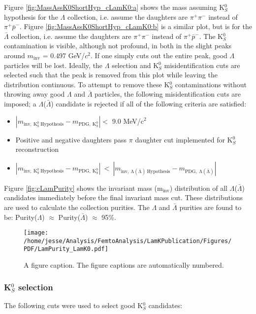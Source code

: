 \documentclass[ALICE,manyauthors]{cernphprep}
\begin{document}
Figure \ref{fig:MassAssK0ShortHyp_cLamK0:a} shows the mass assuming K$^{0}_{S}$ hypothesis for the $\Lambda$ collection, i.e. assume the daughters are $\pi^{+}\pi^{-}$ instead of $\pi^{+}\bar{p}^{-}$.
Figure \ref{fig:MassAssK0ShortHyp_cLamK0:b} is a similar plot, but is for the $\bar{\Lambda}$ collection, i.e. assume the daughters are $\pi^{+}\pi^{-}$ instead of $\pi^{+}\bar{p}^{-}$.
The K$^{0}_{S}$ contamination is visible, although not profound, in both in the slight peaks around $m_{\mathrm{inv}}$ = 0.497 GeV/$c^{2}$.
If one simply cuts out the entire peak, good $\Lambda$ particles will be lost.
Ideally, the $\Lambda$ selection and K$^{0}_{S}$ misidentification cuts are selected such that the peak is removed from this plot while leaving the distribution continuous.
To attempt to remove these K$^{0}_{S}$ contaminations without throwing away good $\Lambda$ and $\bar{\Lambda}$ particles, the following misidentification cuts are imposed; a $\Lambda$($\bar{\Lambda}$) candidate is rejected if all of the following criteria are satisfied:
\begin{itemize}
 \item $\left|m_{\mathrm{inv,~ K^{0}_{S}~ Hypothesis}} - m_{\mathrm{PDG,~ K^{0}_{S}}}\right| < $ 9.0 MeV/c$^{2}$
 \item Positive and negative daughters pass $\pi$ daughter cut implemented for K$^{0}_{S}$ reconstruction
 \item $\left|m_{\mathrm{inv,~ K^{0}_{S}~ Hypothesis}} - m_{\mathrm{PDG,~ K^{0}_{S}}}\right|~ < ~\left|m_{\mathrm{inv,~ \Lambda(\bar{\Lambda})~ Hypothesis}} - m_{\mathrm{PDG,~ \Lambda(\bar{\Lambda})}}\right|$
\end{itemize} 


Figure \ref{fig:cLamPurity} shows the invariant mass (m$_{\mathrm{inv}}$) distribution of all $\Lambda$($\bar{\Lambda}$) candidates immediately before the final invariant mass cut.
These distributions are used to calculate the collection purities.
The $\Lambda$ and $\bar{\Lambda}$ purities are found to be: Purity($\Lambda$) $\approx$ Purity($\bar{\Lambda}$) $\approx$ 95\%.


\begin{figure}[b]
\texttt{[image: /home/jesse/Analysis/FemtoAnalysis/LamKPublication/Figures/PDF/LamPurity\_LamK0.pdf]}%
\caption{\label{fig:epsart} A figure caption. The figure captions are
automatically numbered.}
\end{figure}

\subsubsection{K$^{0}_{S}$ selection}
\label{sec:K0sSelection}
The following cuts were used to select good K$^{0}_{S}$ candidates:
\end{document}
